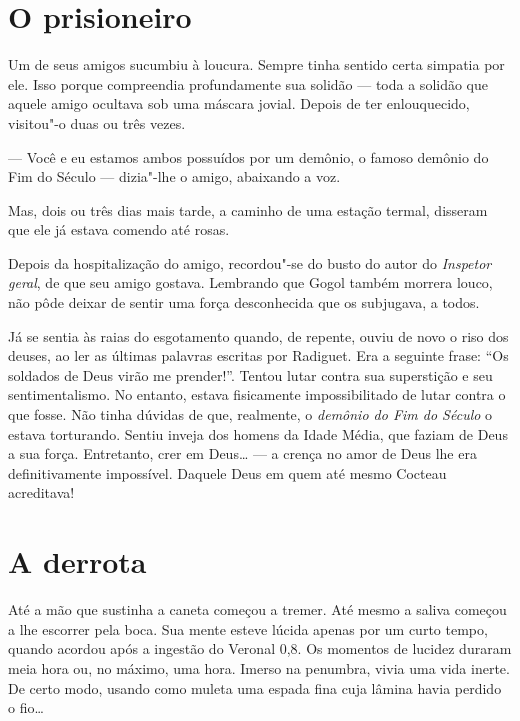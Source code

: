 \section{O prisioneiro}

Um de seus amigos sucumbiu à loucura. Sempre tinha sentido certa
simpatia por ele. Isso porque compreendia profundamente sua solidão ---
toda a solidão que aquele amigo ocultava sob uma máscara jovial. Depois
de ter enlouquecido, visitou"-o duas ou três vezes.

--- Você e eu estamos ambos possuídos por um demônio, o famoso demônio do
Fim do Século --- dizia"-lhe o amigo, abaixando a voz.

Mas, dois ou três dias mais tarde, a caminho de uma estação termal,
disseram que ele já estava comendo até rosas.

Depois da hospitalização do amigo, recordou"-se do busto do autor do
\textit{Inspetor geral}, de que seu amigo gostava. Lembrando que Gogol
também morrera louco, não pôde deixar de sentir uma força desconhecida
que os subjugava, a todos.

Já se sentia às raias do esgotamento quando, de repente, ouviu de novo o
riso dos deuses, ao ler as últimas palavras escritas por Radiguet. Era
a seguinte frase: ``Os soldados de Deus virão me prender!''. Tentou lutar
contra sua superstição e seu sentimentalismo. No entanto, estava
fisicamente impossibilitado de lutar contra o que fosse. Não tinha
dúvidas de que, realmente, o \textit{demônio do Fim do Século} o estava
torturando. Sentiu inveja dos homens da Idade Média, que faziam de Deus
a sua força. Entretanto, crer em Deus\ldots{} --- a crença no amor de Deus lhe
era definitivamente impossível. Daquele Deus em quem até mesmo Cocteau
acreditava!

\section{A derrota}

Até a mão que sustinha a caneta começou a tremer. Até mesmo a saliva
começou a lhe escorrer pela boca. Sua mente esteve lúcida apenas por um
curto tempo, quando acordou após a ingestão do Veronal 0,8. Os momentos
de lucidez duraram meia hora ou, no máximo, uma hora. Imerso na
penumbra, vivia uma vida inerte. De certo modo, usando como muleta uma
espada fina cuja lâmina havia perdido o fio\ldots{}

